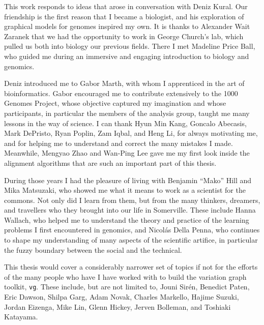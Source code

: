 
\begin{acknowledgements}      

  This work responds to ideas that arose in conversation with Deniz Kural.
  Our friendship is the first reason that I became a biologist, and his exploration of graphical models for genomes inspired my own.
  It is thanks to Alexander Wait Zaranek that we had the opportunity to work in George Church's lab, which pulled us both into biology our previous fields.
  There I met Madeline Price Ball, who guided me during an immersive and engaging introduction to biology and genomics.
  
  Deniz introduced me to Gabor Marth, with whom I apprenticed in the art of bioinformatics.
  Gabor encouraged me to contribute extensively to the 1000 Genomes Project, whose objective captured my imagination and whose participants, in particular the members of the analysis group, taught me many lessons in the way of science.
  I can thank Hyun Min Kang, Goncalo Abecasis, Mark DePristo, Ryan Poplin, Zam Iqbal, and Heng Li, for always motivating me, and for helping me to understand and correct the many mistakes I made.
  Meanwhile, Mengyao Zhao and Wan-Ping Lee gave me my first look inside the alignment algorithms that are such an important part of this thesis.

  During those years I had the pleasure of living with Benjamin ``Mako'' Hill and Mika Matsuzaki, who showed me what it means to work as a scientist for the commons.
  Not only did I learn from them, but from the many thinkers, dreamers, and travellers who they brought into our life in Somerville.
  These include Hanna Wallach, who helped me to understand the theory and practice of the learning problems I first encountered in genomics, and Nicol\'{a}s Della Penna, who continues to shape my understanding of many aspects of the scientific artifice, in particular the fuzzy boundary between the social and the technical.
  
  This thesis would cover a considerably narrower set of topics if not for the efforts of the many people who have I have worked with to build the variation graph toolkit, {\tt vg}.
  These include, but are not limited to,
  Jouni Sir\'{e}n,
  Benedict Paten,
  Eric Dawson,
  Shilpa Garg,
  Adam Novak,
  Charles Markello,
  Hajime Suzuki,
  Jordan Eizenga,
  Mike Lin,
  Glenn Hickey,
  Jerven Bolleman,
  and Toshiaki Katayama.


\end{acknowledgements}
